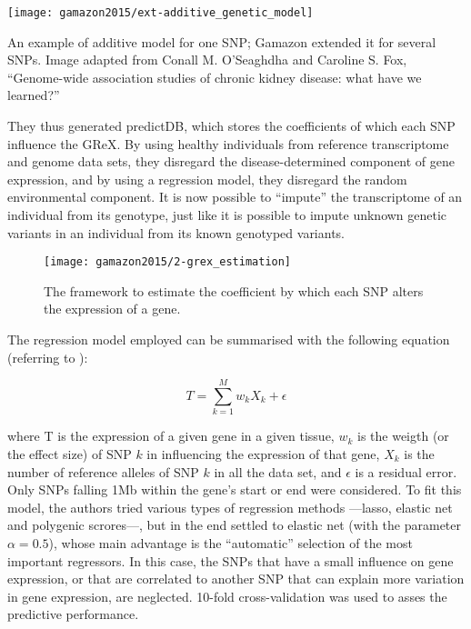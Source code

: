 \documentclass[../main.tex]{subfiles}
\begin{document}
\begin{marginfigure}[-7cm]
	\texttt{[image: gamazon2015/ext-additive\_genetic\_model]}
	\caption{An example of additive model for one SNP; Gamazon \etal 
extended it for several SNPs. Image adapted from Conall M. O'Seaghdha 
and Caroline S. Fox, \enquote{Genome-wide association studies of chronic 
kidney disease: what have we learned?}}
\end{marginfigure}

They thus generated predictDB, which stores the coefficients of which 
each SNP influence the GReX. By using healthy individuals from reference 
transcriptome and genome data sets, they disregard the 
disease-determined component of gene expression, and by using a 
regression model, they disregard the random environmental component. It 
is now possible to \enquote{impute} the transcriptome of an individual 
from its genotype, just like it is possible to impute unknown genetic 
variants in an individual from its known genotyped variants.

\begin{figure}
	\centering
	\texttt{[image: gamazon2015/2-grex\_estimation]}
	\caption{The framework to estimate the coefficient by which each SNP 
alters the expression of a gene.}
\end{figure}

The regression model employed can be summarised with the following 
equation (referring to ):

\begin{equation}
	T = \sum_{k=1}^{M}w_k X_k + \epsilon
\end{equation}

where T is the expression of a given gene in a given tissue, $w_k$ is 
the weigth (or the effect size) of SNP $k$ in influencing the expression 
of that gene, $X_k$ is the number of reference alleles of SNP $k$ in all 
the data set, and $\epsilon$ is a residual error. Only SNPs falling 1Mb 
within the gene's start or end were considered. To fit this model, the 
authors tried various types of regression methods ---lasso, elastic net 
and polygenic scrores---, but in the end settled to elastic 
net (with the 
parameter $\alpha = 0.5$), whose main advantage is the 
\enquote{automatic} selection of the most important regressors. In this 
case, the SNPs that have a small influence on gene expression, or that 
are correlated to another SNP that can explain more variation in gene 
expression, are neglected. 10-fold cross-validation was used to asses the 
predictive performance.
\end{document}
